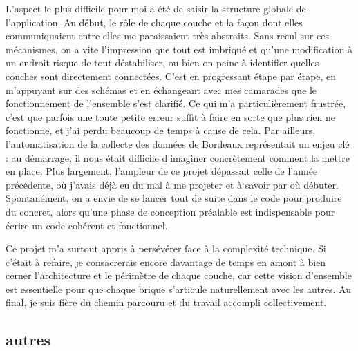 \documentclass[
  french,
  11pt,
  a4paper,
]{article}
\begin{document}
L'aspect le plus difficile pour moi a été de saisir la structure globale
de l'application. Au début, le rôle de chaque couche et la façon dont
elles communiquaient entre elles me paraissaient très abstraits. Sans
recul sur ces mécanismes, on a vite l'impression que tout est imbriqué
et qu'une modification à un endroit risque de tout déstabiliser, ou bien
on peine à identifier quelles couches sont directement connectées. C'est
en progressant étape par étape, en m'appuyant sur des schémas et en
échangeant avec mes camarades que le fonctionnement de l'ensemble s'est
clarifié. Ce qui m'a particulièrement frustrée, c'est que parfois une
toute petite erreur suffit à faire en sorte que plus rien ne fonctionne,
et j'ai perdu beaucoup de temps à cause de cela. Par ailleurs,
l'automatisation de la collecte des données de Bordeaux représentait un
enjeu clé : au démarrage, il nous était difficile d'imaginer
concrètement comment la mettre en place. Plus largement, l'ampleur de ce
projet dépassait celle de l'année précédente, où j'avais déjà eu du mal
à me projeter et à savoir par où débuter. Spontanément, on a envie de se
lancer tout de suite dans le code pour produire du concret, alors qu'une
phase de conception préalable est indispensable pour écrire un code
cohérent et fonctionnel.

Ce projet m'a surtout appris à persévérer face à la complexité
technique. Si c'était à refaire, je consacrerais encore davantage de
temps en amont à bien cerner l'architecture et le périmètre de chaque
couche, car cette vision d'ensemble est essentielle pour que chaque
brique s'articule naturellement avec les autres. Au final, je suis fière
du chemin parcouru et du travail accompli collectivement.

\subsection{autres}\label{autres}
\end{document}
